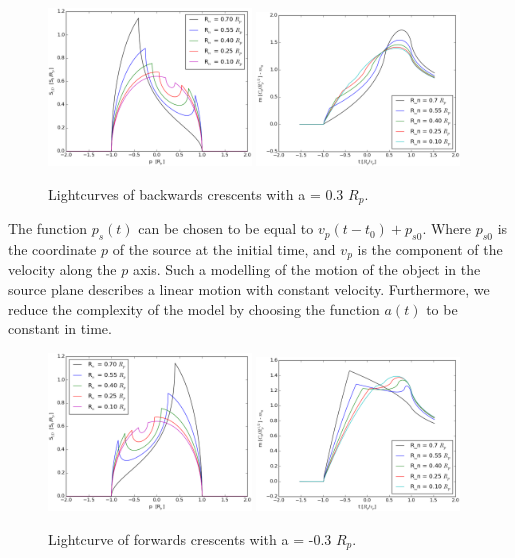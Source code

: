\begin{figure}
\centering
	\includegraphics[width = 0.48\textwidth]{plots/4rn_profile.eps}
	\includegraphics[width = 0.48\textwidth]{plots/4rn_magnification.eps}
\caption{\label{fig:lightcurve_crescent_back} Lightcurves of backwards crescents with  a = 0.3 $R_p$.}
\end{figure}

The function $p_s(t)$ can be chosen to be equal to $v_p(t-t_0) + p_{s0}$. Where $p_{s0}$ is the coordinate $p$ of the source at the initial time, and $v_p$ is the component of the velocity
along the $p$ axis. Such a modelling of the motion of the object in the source plane describes a linear motion with constant velocity. Furthermore, we reduce the complexity of the model by 
choosing the function $a(t)$ to be constant in time.  

\begin{figure}
\centering
	\includegraphics[width = 0.48\textwidth]{plots/4rn2_profile.eps}
	\includegraphics[width = 0.48\textwidth]{plots/4rn2_magnification.eps}
\caption{\label{fig:lightcurve_crescent} Lightcurve of forwards crescents with a = -0.3 $R_p$.}
\end{figure}

